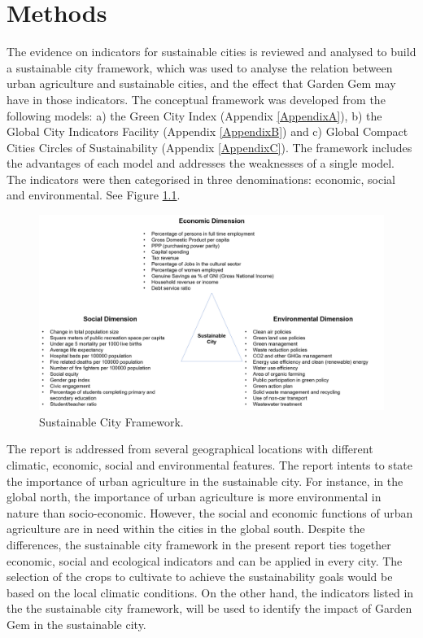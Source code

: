 \chapter{Methods} %

\label{Chapter:Methods}

The evidence on indicators for sustainable cities is reviewed and analysed to build a sustainable city framework, which was used to analyse the relation between urban agriculture and sustainable cities, and the effect that Garden Gem may have in those indicators. The conceptual framework was developed from the following models: a) the Green City Index (Appendix \ref{AppendixA}), b) the Global City Indicators Facility (Appendix \ref{AppendixB}) and c) Global Compact Cities Circles of Sustainability (Appendix \ref{AppendixC}). The framework includes the advantages of each model and addresses the weaknesses of a single model. The indicators were then categorised in three denominations: economic, social and environmental. See Figure \ref{fig:sustainableCityFramework}.

\begin{figure}[th]
\centering
\includegraphics[width=1.00\textwidth]{./Figures/sustainableCityFramework.png}
\decoRule
\caption[Sustainable City Framework]{Sustainable City Framework.}
\label{fig:sustainableCityFramework}
\end{figure}

The report is addressed from several geographical locations with different climatic, economic, social and environmental features. The report intents to state the importance of urban agriculture in the sustainable city. For instance, in the global north, the importance of urban agriculture is more environmental in nature than socio-economic. However, the social and economic functions of urban agriculture are in need within the cities in the global south. Despite the differences, the sustainable city framework in the present report ties together economic, social and ecological indicators and can be applied in every city. The selection of the crops to cultivate to achieve the sustainability goals would be based on the local climatic conditions. On the other hand, the indicators listed in the the sustainable city framework, will be used to identify the impact of Garden Gem in the sustainable city.

